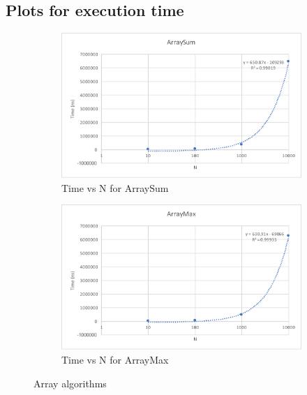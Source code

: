 \documentclass[a4paper,12pt]{article}
\begin{document}
    \subsection{Plots for execution time}
    \begin{figure}[ht]
        \begin{subfigure}[t]{0.444\textwidth}
            \centering
            \includegraphics[width=\textwidth]{ArraySum.pdf}
            \caption{Time vs N for ArraySum}
        \end{subfigure}
        \begin{subfigure}[t]{0.444\textwidth}
            \centering
            \includegraphics[width=\textwidth]{ArrayMax.pdf}
            \caption{Time vs N for ArrayMax}
        \end{subfigure}
        \caption{Array algorithms}
    \end{figure}
\end{document}
